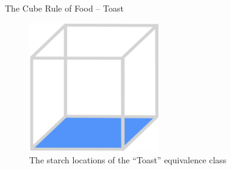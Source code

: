 \documentclass{beamer}
\begin{document}
\begin{frame}{The Cube Rule of Food -- Toast}
    \begin{figure}
        \includegraphics[width=0.5\textwidth]{toast/16_toast.jpg}
        \caption{\label{fig:toast-diagram}The starch locations of the ``Toast'' equivalence class}
    \end{figure}
\end{frame}
\end{document}
